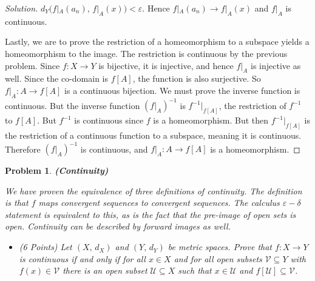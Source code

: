 \documentclass{article}
\theoremstyle{normal}
\newtheorem{problem}{Problem}
\begin{document}
\begin{proof}[Solution]
        $d_{Y}\big(f|_{A}(a_{n}),\,f|_{A}(x)\big)<\varepsilon$. Hence
        $f|_{A}(a_{n})\rightarrow{f}|_{A}(x)$ and $f|_{A}$ is continuous.
        \par\hfill\par
        Lastly, we are to prove the restriction of a homeomorphism to a subspace
        yields a homeomorphism to the image. The restriction is continuous by
        the previous problem. Since $f:X\rightarrow{Y}$ is bijective, it is
        injective, and hence $f|_{A}$ is injective as well. Since the co-domain
        is $f[A]$, the function is also surjective. So
        $f|_{A}:A\rightarrow{f}[A]$ is a continuous bijection. We must prove
        the inverse function is continuous. But the inverse function
        $(f|_{A})^{-1}$ is $f^{-1}|_{f[A]}$, the restriction of $f^{-1}$ to
        $f[A]$. But $f^{-1}$ is continuous since $f$ is a homeomorphism. But
        then $f^{-1}|_{f[A]}$ is the restriction of a continuous function to a
        subspace, meaning it is continuous. Therefore
        $(f|_{A})^{-1}$ is continuous, and $f|_{A}:A\rightarrow{f[A]}$ is a
        homeomorphism.
    \end{proof}
    \newpage
    \color{blue}
    \begin{problem}
        \textbf{(Continuity)}
        \par\hfill\par
        We have proven the equivalence of three definitions of continuity.
        The definition is that $f$ maps convergent sequences to convergent
        sequences. The calculus $\varepsilon-\delta$ statement is equivalent to
        this, as is the fact that the pre-image of open sets is open. Continuity
        can be described by forward images as well.
        \begin{itemize}
            \item (6 Points) Let $(X,\,d_{X})$ and $(Y,\,d_{Y})$ be metric
                spaces. Prove that $f:X\rightarrow{Y}$ is continuous if and only
                if for all $x\in{X}$ and for all open subsets
                $\mathcal{V}\subseteq{Y}$ with $f(x)\in\mathcal{V}$ there is an
                open subset $\mathcal{U}\subseteq{X}$ such that
                $x\in\mathcal{U}$ and $f[\mathcal{U}]\subseteq\mathcal{V}$.
        \end{itemize}
    \end{problem}
    \color{black}
\end{document}
